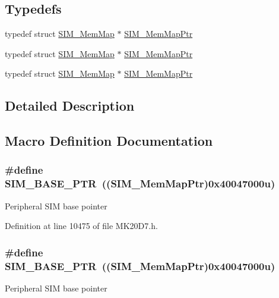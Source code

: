 \subsection*{Typedefs}
\begin{DoxyCompactItemize}
\item 
typedef struct \hyperlink{struct_s_i_m___mem_map}{S\+I\+M\+\_\+\+Mem\+Map} $\ast$ \hyperlink{group___s_i_m___peripheral_ga708a122e8ca55082e0cf67cab6a77d02}{S\+I\+M\+\_\+\+Mem\+Map\+Ptr}
\item 
typedef struct \hyperlink{struct_s_i_m___mem_map}{S\+I\+M\+\_\+\+Mem\+Map} $\ast$ \hyperlink{group___s_i_m___peripheral_ga708a122e8ca55082e0cf67cab6a77d02}{S\+I\+M\+\_\+\+Mem\+Map\+Ptr}
\item 
typedef struct \hyperlink{struct_s_i_m___mem_map}{S\+I\+M\+\_\+\+Mem\+Map} $\ast$ \hyperlink{group___s_i_m___peripheral_ga708a122e8ca55082e0cf67cab6a77d02}{S\+I\+M\+\_\+\+Mem\+Map\+Ptr}
\end{DoxyCompactItemize}


\subsection{Detailed Description}


\subsection{Macro Definition Documentation}
\subsubsection[{\texorpdfstring{S\+I\+M\+\_\+\+B\+A\+S\+E\+\_\+\+P\+TR}{SIM_BASE_PTR}}]{\setlength{\rightskip}{0pt plus 5cm}\#define S\+I\+M\+\_\+\+B\+A\+S\+E\+\_\+\+P\+TR~(({\bf S\+I\+M\+\_\+\+Mem\+Map\+Ptr})0x40047000u)}\hypertarget{group___s_i_m___peripheral_ga719ec5df95fbb5732438f794f2cccf3c}{}\label{group___s_i_m___peripheral_ga719ec5df95fbb5732438f794f2cccf3c}
Peripheral S\+IM base pointer 

Definition at line 10475 of file M\+K20\+D7.\+h.

\subsubsection[{\texorpdfstring{S\+I\+M\+\_\+\+B\+A\+S\+E\+\_\+\+P\+TR}{SIM_BASE_PTR}}]{\setlength{\rightskip}{0pt plus 5cm}\#define S\+I\+M\+\_\+\+B\+A\+S\+E\+\_\+\+P\+TR~(({\bf S\+I\+M\+\_\+\+Mem\+Map\+Ptr})0x40047000u)}\hypertarget{group___s_i_m___peripheral_ga719ec5df95fbb5732438f794f2cccf3c}{}\label{group___s_i_m___peripheral_ga719ec5df95fbb5732438f794f2cccf3c}
Peripheral S\+IM base pointer 

